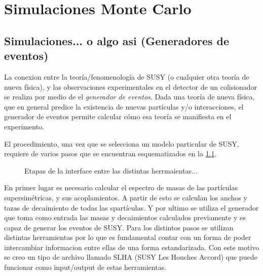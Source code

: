 \chapter{Simulaciones Monte Carlo}



\section{Simulaciones... o algo asi (Generadores de eventos)}

La conexion entre la teoría/fenomenología de SUSY (o cualquier otra teoría de
nueva física), y las observaciones experimentales en el detector de un
colisionador se realiza por medio de el \emph{generador de eventos}. Dada una
teoría de nueva física, que en general predice la existencia de nuevas
partículas y/o interacciones, el generador de eventos permite calcular cómo esa
teoría se manifiesta en el experimento.

El procedimiento, una vez que se selecciona un modelo particular de SUSY,
requiere de varios pasos que se encuentran esquematizados en la
\cref{fig:mc_sketch}.

\begin{figure}[h]
  \centering
  \scalebox{0.8}{}
  \caption{Etapas de la interface entre las distintas herrmaientas...}
  \label{fig:mc_sketch}
\end{figure}


En primer lugar es necesario calcular el espectro de masas de las partículas
supersimétricas, y sus acoplamientos. A partir de esto se calculan los anchos y
tazas de decaimiento de todas las spartículas. Y por ultimo se utiliza el
generador que toma como entrada las masas y decaimientos calculados previamente
y es capaz de generar los eventos de SUSY. Para los distintos pasos se utilizan
distintas herramientas por lo que es fundamental contar con un forma de poder
intercambiar informacion entre ellas de una forma estandarizada. Con este motivo
se creo un tipo de archivo llamado SLHA (SUSY Les Houches Accord)\cite{SLHA} que
puede funcionar como input/output de estas herramientas.



